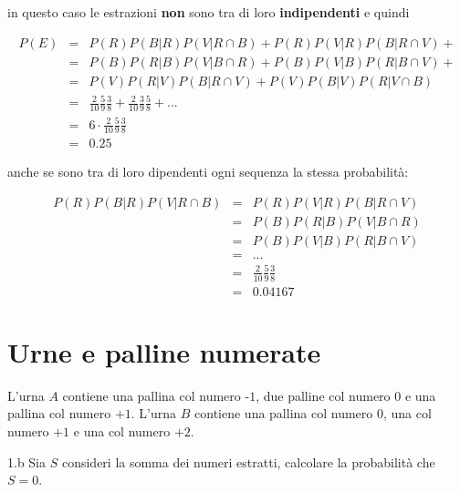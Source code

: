 \documentclass[
  11pt,
]{book}
\theoremstyle{mytheoremstyle}
\theoremstyle{mydefstyle}
\newenvironment{nota}
  {
\begin{tcolorbox}[enhanced,breakable,arc=0.1mm,boxrule=1pt,colback=white,colframe=iblue,title=\bf \fontfamily{lmss}\selectfont \faInfoCircle \hspace{.5 cm} Nota,drop fuzzy shadow]
}{
\end{tcolorbox}
  }
\newenvironment{sol}
  {
  \begin{tcolorbox}[enhanced,breakable,arc=0.1mm,boxrule=1pt,colback=white,colframe=iblue,
  title=\bf \fontfamily{lmss}\selectfont \hspace{.5 cm} Soluzione,drop fuzzy shadow]

}{
\end{tcolorbox}
  }
\begin{document}
\begin{sol}
in questo caso le estrazioni \textbf{non} sono tra di loro \textbf{indipendenti} e quindi

\begin{eqnarray*}
  P(E)  &=& P(R)P(B|R)P(V|R\cap B)+P(R)P(V|R)P(B|R\cap V)+\\
        &=& P(B)P(R|B)P(V|B\cap R)+P(B)P(V|B)P(R|B\cap V)+\\
        &=& P(V)P(R|V)P(B|R\cap V)+P(V)P(B|V)P(R|V\cap B)\\
        &=& \frac2{10}\frac5{9}\frac3{8}+\frac2{10}\frac3{9}\frac5{8}+...\\
        &=& 6 \cdot \frac2{10}\frac5{9}\frac3{8}\\
        &=& 0.25
\end{eqnarray*}

\begin{nota}
anche se sono tra di loro dipendenti ogni sequenza la stessa probabilità:

\end{nota}

\begin{eqnarray*}
 P(R)P(B|R)P(V|R\cap B)&=&P(R)P(V|R)P(B|R\cap V)\\
        &=& P(B)P(R|B)P(V|B\cap R)\\
        &=& P(B)P(V|B)P(R|B\cap V)\\
        &=& ...\\
        &=& \frac2{10}\frac5{9}\frac3{8}\\
        &=& 0.04167
\end{eqnarray*}

\end{sol}

\section{Urne e palline numerate}\label{urne-e-palline-numerate}

L'urna \(A\) contiene una pallina col numero \(\mbox{-1}\), due palline col numero \(\mbox{0}\)
e una pallina col numero \(\mbox{+1}\).
L'urna \(B\) contiene una pallina col numero \(\mbox{0}\), una col numero \(\mbox{+1}\)
e una col numero \(\mbox{+2}\).

1.b Sia \(S\) consideri la somma dei numeri estratti, calcolare la probabilità che
\(S=0\).
\end{document}
